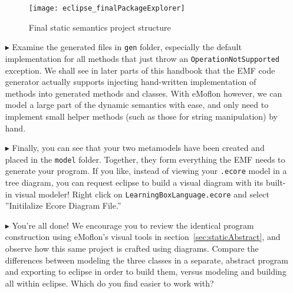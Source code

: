 \begin{itemize}
\begin{figure}[htbp]
	\centering
  \texttt{[image: eclipse\_finalPackageExplorer]}
	\caption{Final static semantics project structure}
	\label{fig:builtModel}
\end{figure}

\item[$\blacktriangleright$] Examine the generated files in \texttt{gen} folder, especially the default implementation for all methods that just throw an \texttt{OperationNotSupported} exception. We shall see in later parts of this handbook that the EMF code generator actually supports injecting hand-written implementation of methods into generated methods and classes. With eMoflon however, we can model a large part of the dynamic semantics with ease, and only need to implement small helper methods (such as those for string manipulation) by hand.

\item[$\blacktriangleright$] Finally, you can see that your two metamodels have been created and placed in the \texttt{model} folder. Together, they form everything the EMF needs to generate your program. If you like, instead of viewing your \texttt{.ecore} model in a tree diagram, you can request eclipse to build a visual diagram with its built-in visual modeler! Right click on \texttt{LearningBoxLanguage.ecore} and select ''Initilalize Ecore Diagram File.''


\item[$\blacktriangleright$] You're all done! We encourage you to review the identical program construction using eMoflon's visual tools in section~\ref{sec:staticAbstract}, and observe how this same project is crafted using diagrams. Compare the differences between modeling the three classes in a separate, abstract program and exporting to eclipse in order to build them, versus modeling and building all within eclipse. Which do you find easier to work with?

\end{itemize}
